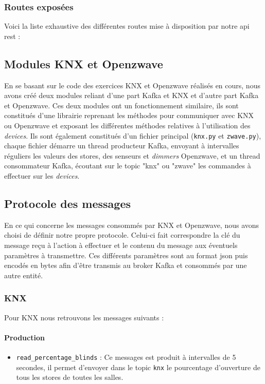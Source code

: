 \subsubsection{Routes exposées}
Voici la liste exhaustive des différentes routes mise à disposition par notre \acrshort{api} \acrshort{rest} : 

\subsection{Modules KNX et Openzwave}
En se basant sur le code des exercices KNX et Openzwave réalisés en cours, nous avons créé deux modules reliant d'une part Kafka et KNX et d'autre part Kafka et Openzwave. Ces deux modules ont un fonctionnement similaire, ils sont constitués d'une librairie reprenant les méthodes pour communiquer avec KNX ou Openzwave et exposant les différentes méthodes relatives à l'utilisation des \textit{\textit{devices}}. Ils sont également constitués d'un fichier principal (\texttt{knx.py} et \texttt{zwave.py}), chaque fichier démarre un thread producteur Kafka, envoyant à intervalles réguliers les valeurs des stores, des senseurs et \textit{dimmers} Openzwave, et un thread consommateur Kafka, écoutant sur le topic "knx" ou "zwave" les commandes à effectuer sur les \textit{\textit{devices}}.

\subsection{Protocole des messages}
En ce qui concerne les messages consommés par KNX et Openzwave, nous avons choisi de définir notre propre protocole.
Celui-ci fait correspondre la clé du message reçu à l'action à effectuer et le contenu du message aux éventuels paramètres à transmettre. Ces différents paramètres sont au format \acrshort{json} puis encodés en bytes afin d'être transmis au broker Kafka et consommés par une autre entité.

\subsubsection{KNX}
Pour KNX nous retrouvons les messages suivants : 
\paragraph{Production}
\begin{itemize}
    \item \texttt{read_percentage_blinds} : Ce messages est produit à intervalles de 5 secondes, il permet d'envoyer dans le topic \texttt{knx} le pourcentage d'ouverture de tous les stores de toutes les salles. 
\end{itemize}

